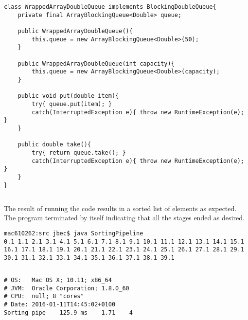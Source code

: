 \documentclass{ituhandin}
\begin{document}
\chapter{} %
\section{} %
\begin{lstlisting}[caption=Implemented code for wrapping \texttt{ArrayBlockingQueue}]
class WrappedArrayDoubleQueue implements BlockingDoubleQueue{
    private final ArrayBlockingQueue<Double> queue;

    public WrappedArrayDoubleQueue(){
        this.queue = new ArrayBlockingQueue<Double>(50);
    }

    public WrappedArrayDoubleQueue(int capacity){
        this.queue = new ArrayBlockingQueue<Double>(capacity);
    }

    public void put(double item){
        try{ queue.put(item); }
        catch(InterruptedException e){ throw new RuntimeException(e); }
    }

    public double take(){
        try{ return queue.take(); }
        catch(InterruptedException e){ throw new RuntimeException(e); }
    }
}
\end{lstlisting}
\section{} %
The result of running the code results in a sorted list of elements as expected. The program terminated by itself indicating that all the stages ended as desired.
\begin{lstlisting}[language={},frame={}]
mac610262:src jbec$ java SortingPipeline
0.1 1.1 2.1 3.1 4.1 5.1 6.1 7.1 8.1 9.1 10.1 11.1 12.1 13.1 14.1 15.1 16.1 17.1 18.1 19.1 20.1 21.1 22.1 23.1 24.1 25.1 26.1 27.1 28.1 29.1 30.1 31.1 32.1 33.1 34.1 35.1 36.1 37.1 38.1 39.1
\end{lstlisting}
\section{}\label{sec:sortingpipelinetests}


\begin{lstlisting}[language={},frame={}]
# OS:   Mac OS X; 10.11; x86_64
# JVM:  Oracle Corporation; 1.8.0_60
# CPU:  null; 8 "cores"
# Date: 2016-01-11T14:45:02+0100
Sorting pipe    125.9 ms    1.71    4
\end{lstlisting}
\end{document}
